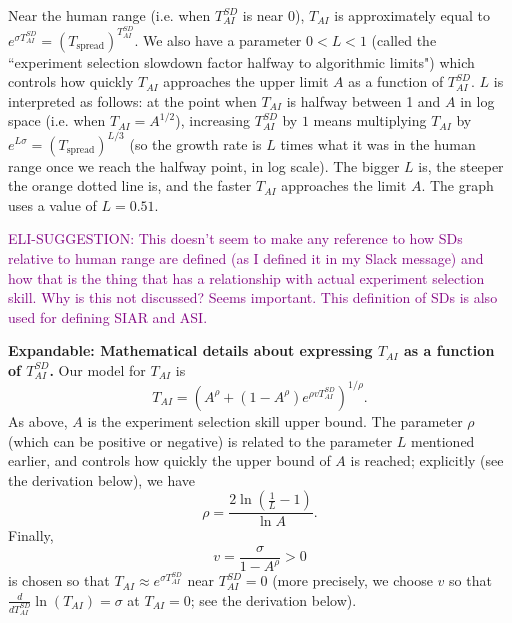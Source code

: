 \documentclass{article}
\theoremstyle{definition}
\newcommand{\ESUG}[1]{\textcolor{purple}{ELI-SUGGESTION: #1}}
\begin{document}
Near the human range (i.e. when $T_{AI}^{SD}$ is near 0), $T_{AI}$ is approximately equal to $e^{\sigma T_{AI}^{SD}} = \left(T_\text{spread}\right)^{T_{AI}^{SD}}$. %
We also have a parameter $0 < L < 1$ (called the ``experiment selection slowdown factor halfway to algorithmic limits") which controls how quickly $T_{AI}$ approaches the upper limit $A$ as a function of $T_{AI}^{SD}$. %
$L$ is interpreted as follows: at the point when $T_{AI}$ is halfway between 1 and $A$ in log space (i.e. when $T_{AI} = A^{1/2}$), increasing $T_{AI}^{SD}$ by $1$ means multiplying $T_{AI}$ by $e^{L \sigma} = \left(T_\text{spread}\right)^{L/3}$ (so the growth rate is $L$ times what it was in the human range once we reach the halfway point, in log scale). The bigger $L$ is, the steeper the orange dotted line is, and the faster $T_{AI}$ approaches the limit $A$. The graph uses a value of $L = 0.51$.

\ESUG{This doesn't seem to make any reference to how SDs relative to human range are defined (as I defined it in my Slack message) and how that is the thing that has a relationship with actual experiment selection skill. Why is this not discussed? Seems important. This definition of SDs is also used for defining SIAR and ASI.}


\textbf{Expandable: Mathematical details about expressing $T_{AI}$ as a function of $T_{AI}^{SD}$.}
Our model for $T_{AI}$ is
\[ T_{AI} = \left( A^\rho + (1-A^\rho) e^{\rho v T_{AI}^{SD}}\right)^{1/\rho}.\]
As above, $A$ is the experiment selection skill upper bound. The parameter $\rho$ (which can be positive or negative) is related to the parameter $L$ mentioned earlier, and controls how quickly the upper bound of $A$ is reached; explicitly (see the derivation below), we have
\begin{equation} \label{rho}
\rho = \frac{2 \ln\left(\frac{1}{L}-1\right)}{\ln A}.
\end{equation}
Finally,
\begin{equation} \label{v}
v = \frac{\sigma}{1-A^\rho} > 0
\end{equation}
is chosen so that $T_{AI} \approx e^{\sigma T_{AI}^{SD}}$ near $T_{AI}^{SD} = 0$ (more precisely, we choose $v$ so that $\frac{d}{d T_{AI}^{SD}}\ln(T_{AI}) = \sigma$ at $T_{AI} = 0$; see the derivation below).
\end{document}
